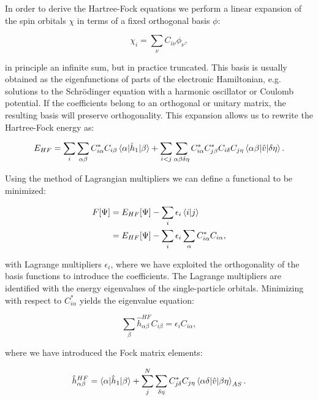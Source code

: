 In order to derive the Hartree-Fock equations
we perform a linear expansion of the spin orbitals
$\chi$ in terms of a fixed orthogonal basis $\phi$:

\begin{equation}
 \chi_i = \sum_{\nu} C_{i\nu} \phi_{\nu} , 
\end{equation}

in principle an infinite sum, but in practice truncated.
This basis is usually obtained as the eigenfunctions of
parts of the electronic Hamiltonian, e.g. solutions
to the Schr\"{o}dinger equation with a harmonic oscillator
or Coulomb potential.
If the coefficients belong to an orthogonal or unitary matrix,
the resulting basis will preserve orthogonality.
This expansion allows us to rewrite the Hartree-Fock energy as:

\begin{equation}
 E_{HF} = \sum_i \sum_{\alpha \beta}
    C_{i \alpha}^* C_{i\beta} \braket{\alpha | \hat{h}_1 | \beta}
    + \sum_{i < j} \sum_{\alpha \beta \delta \eta}
    C_{i\alpha}^* C_{j\beta}^* C_{i\delta} C_{j\eta}
    \braket{\alpha \beta | \hat{v} | \delta \eta} .
\end{equation}

Using the method of Lagrangian multipliers
we can define a functional to be minimized:

\begin{equation}
\begin{split}
F[\Psi] &= E_{HF}[\Psi] - \sum_i \epsilon_i \braket{i | j} \\
        &= E_{HF}[\Psi] - \sum_i \epsilon_i \sum_{\alpha}
        C_{i\alpha}^* C_{i\alpha} ,
\end{split}
\end{equation}

with Lagrange multipliers $\epsilon_i$, where we have
exploited the orthogonality of the basis functions to
introduce the coefficients. The Lagrange multipliers
are identified with the energy eigenvalues
of the single-particle orbitals.
Minimizing with respect to $C_{i\alpha}^*$ yields
the eigenvalue equation:

\begin{equation}
\sum_{\beta} \hat{h}_{\alpha\beta}^{HF} C_{i\beta}
= \epsilon_i C_{i\alpha} ,
\end{equation}

where we have introduced the Fock matrix elements:

\begin{equation}
\hat{h}_{\alpha\beta}^{HF} = 
\braket{\alpha | \hat{h}_1 | \beta}
+ \sum_{j}^N \sum_{\delta\eta} C_{j\delta}^* C_{j\eta}
\braket{\alpha\delta | \hat{v} | \beta\eta}_{AS} .
\end{equation}


